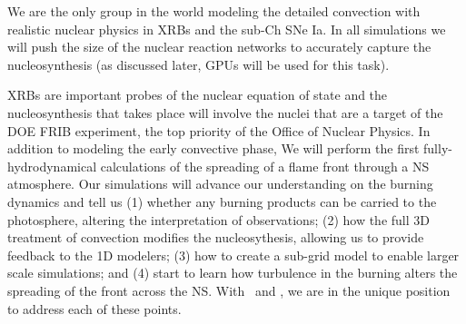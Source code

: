 \documentclass[11pt,letterpaper,english]{article}
\begin{document}

We are the only group in the world modeling the detailed convection
with realistic nuclear physics in XRBs and the sub-Ch SNe Ia.  In all
simulations we will push the size of the nuclear reaction networks to
accurately capture the nucleosynthesis (as discussed later, GPUs will
be used for this task).  

XRBs are important probes of the nuclear equation of state and the
nucleosynthesis that takes place will involve the nuclei that are a
target of the DOE FRIB experiment, the top priority of the Office of
Nuclear Physics.  In addition to modeling the early convective phase,
We will perform the first fully-hydrodynamical calculations of the
spreading of a flame front through a NS atmosphere.  Our simulations
will advance our understanding on the burning dynamics and tell us (1)
whether any burning products can be carried to the photosphere,
altering the interpretation of observations; (2) how the full 3D
treatment of convection modifies the nucleosythesis, allowing us to
provide feedback to the 1D modelers; (3) how to create a sub-grid
model to enable larger scale simulations; and (4) start to learn how
turbulence in the burning alters the spreading of the front across the
NS.  With \maestro\ and \castro, we are in the unique
position to address each of these points.
\end{document}
